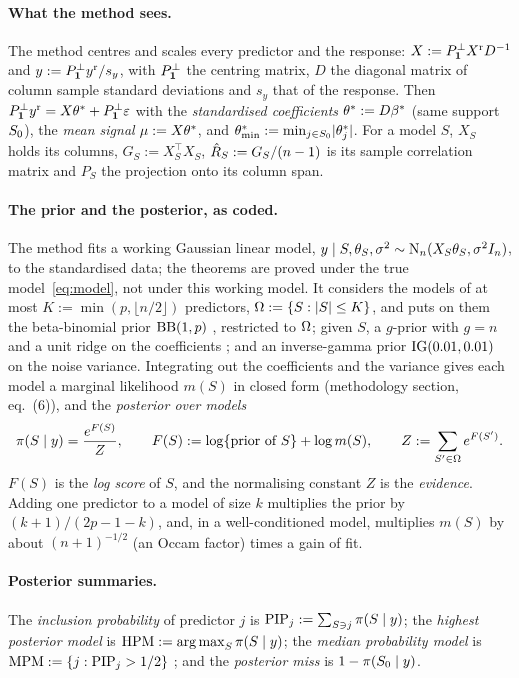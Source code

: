 \paragraph{What the method sees.} The method centres and scales every predictor and the response: $X:=P^\perp_{\mathbf{1}}X^{\mathrm r}
D^{-1}$ and $y:=P^\perp_{\mathbf{1}}y^{\mathrm r}/s_y$, with $P^\perp_{\mathbf{1}}$ the centring matrix, $D$ the diagonal matrix of column sample
standard deviations and $s_y$ that of the response. Then $P^\perp_{\mathbf{1}}y^{\mathrm r}=X\theta^*+P^\perp_{\mathbf{1}}\varepsilon$ with the
\emph{standardised coefficients} $\theta^*:=D\beta^*$ (same support $S_0$), the \emph{mean signal} $\mu:=X\theta^*$, and
$\theta^*_{\min}:=\min_{j\in S_0}\lvert \theta^*_j\rvert$. For a model $S$, $X_S$ holds its columns, $G_S:=X_S^\top X_S$, $\hat R_S:=G_S/(n-1)$
is its sample correlation matrix and $P_S$ the projection onto its column span.

\paragraph{The prior and the posterior, as coded.} The method fits a working Gaussian linear model,
$y\mid S,\theta_S,\sigma^2\sim\mathrm{N}_n(X_S\theta_S,\sigma^2I_n)$, to the standardised data; the theorems are proved
under the true model~\eqref{eq:model}, not under this working model. It considers the models of at most $K:=\min(p,\lfloor
n/2\rfloor)$ predictors, $\Omega:=\{S:\lvert S\rvert\le K\}$, and puts on them the beta-binomial prior $\mathrm{BB}(1,p)$ \citep{ScottBerger2010},
restricted to $\Omega$; given $S$, a $g$-prior with $g=n$ and a unit ridge on the coefficients \citep{Zellner1986}; and an
inverse-gamma prior $\mathrm{IG}(0.01,0.01)$ on the noise variance. Integrating out the coefficients and the variance gives each
model a marginal likelihood $m(S)$ in closed form (methodology section, eq.~(6)), and the \emph{posterior over models}
\begin{equation}\label{eq:posterior}
  \pi(S\mid y)=\frac{e^{F(S)}}{Z},\qquad F(S):=\log\{\text{prior of }S\}+\log m(S),\qquad Z:=\sum_{S'\in\Omega}e^{F(S')} .
\end{equation}
$F(S)$ is the \emph{log score} of $S$, and the normalising constant $Z$ is the \emph{evidence}. Adding one predictor to a model of size $k$ multiplies the prior by
$(k+1)/(2p-1-k)$, and, in a well-conditioned model, multiplies $m(S)$ by about $(n+1)^{-1/2}$ (an Occam factor) times a
gain of fit.

\paragraph{Posterior summaries.} The \emph{inclusion probability} of predictor $j$ is $\mathrm{PIP}_j:=\sum_{S\ni j}\pi(S\mid y)$;
the \emph{highest posterior model} is $\mathrm{HPM}:=\operatorname*{arg\,max}_S\pi(S\mid y)$; the \emph{median probability model} is
$\mathrm{MPM}:=\{j:\mathrm{PIP}_j>1/2\}$ \citep{BarbieriBerger2004}; and the \emph{posterior miss} is $1-\pi(S_0\mid y)$.

